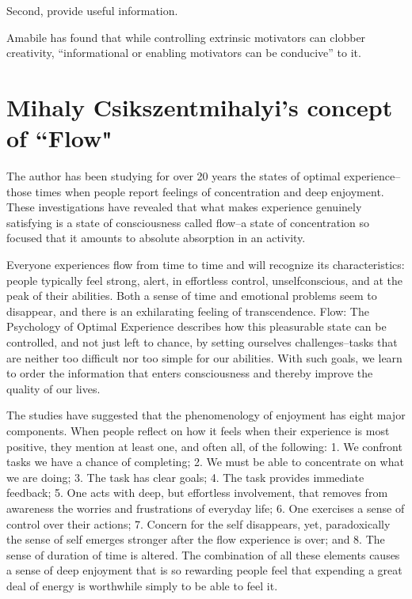 Second, provide useful information.

Amabile has found that while controlling extrinsic motivators can clobber creativity, “informational or enabling motivators can be conducive” to it.



\section{Mihaly Csikszentmihalyi's concept of ``Flow"}
The author has been studying for over 20 years the states of optimal experience--those times when people report feelings of concentration and deep enjoyment. These investigations have revealed that what makes experience genuinely satisfying is a state of consciousness called flow--a state of concentration so focused that it amounts to absolute absorption in an activity. 

Everyone experiences flow from time to time and will recognize its characteristics: people typically feel strong, alert, in effortless control, unselfconscious, and at the peak of their abilities. Both a sense of time and emotional problems seem to disappear, and there is an exhilarating feeling of transcendence. Flow: The Psychology of Optimal Experience describes how this pleasurable state can be controlled, and not just left to chance, by setting ourselves challenges--tasks that are neither too difficult nor too simple for our abilities. With such goals, we learn to order the information that enters consciousness and thereby improve the quality of our lives.

The studies have suggested that the phenomenology of enjoyment has eight major components. When people reflect on how it feels when their experience is most positive, they mention at least one, and often all, of the following:
1. We confront tasks we have a chance of completing;
2. We must be able to concentrate on what we are doing; 3. The task has clear goals;
4. The task provides immediate feedback;
5. One acts with deep, but effortless involvement, that removes from awareness the worries and frustrations
of everyday life;
6. One exercises a sense of control over their actions;
7. Concern for the self disappears, yet, paradoxically
the sense of self emerges stronger after the flow experience is over; and
8. The sense of duration of time is altered.
The combination of all these elements causes a sense of deep enjoyment that is so rewarding people feel that expending a great deal of energy is worthwhile simply to be able to feel it.

